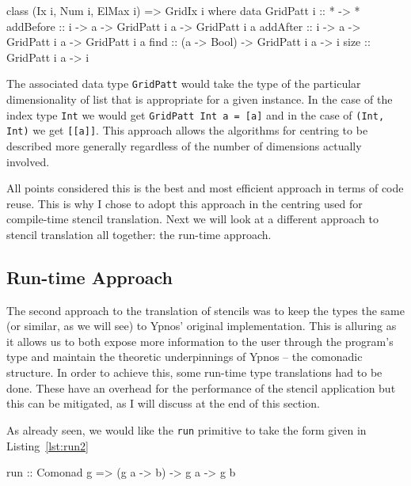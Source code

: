 \documentclass[12pt,a4paper,twoside]{scrbook}
\begin{document}
\begin{hflisting}[label={lst:gridix}, caption=The class declaration of
  \texttt{GridIx} showing the main functions defined for the grid manipulation.]
class (Ix i, Num i, ElMax i) => GridIx i where
    data GridPatt i :: * -> *
    addBefore :: i -> a -> GridPatt i a -> GridPatt i a
    addAfter :: i -> a -> GridPatt i a -> GridPatt i a
    find :: (a -> Bool) -> GridPatt i a -> i
    size :: GridPatt i a -> i
\end{hflisting}

The associated data type \texttt{GridPatt} would take the type of the particular
dimensionality of list that is appropriate for a given instance. In the case of
the index type \texttt{Int} we would get \texttt{GridPatt Int a = {[}a{]}} and
in the case of \texttt{(Int, Int)} we get \texttt{{[}{[}a{]}{]}}. This approach
allows the algorithms for centring to be described more generally regardless of
the number of dimensions actually involved.

All points considered this is the best and most efficient approach in terms of
code reuse. This is why I chose to adopt this approach in the centring used for
compile-time stencil translation. Next we will look at a different approach to
stencil translation all together: the run-time approach.

\subsection{Run-time Approach}
\label{sec:runtimetrans}

The second approach to the translation of stencils was to keep the types the
same (or similar, as we will see) to Ypnos' original implementation.  This is
alluring as it allows us to both expose more information to the user through the
program's type and maintain the theoretic underpinnings of Ypnos -- the
comonadic structure. In order to achieve this, some run-time type translations
had to be done. These have an overhead for the performance of the stencil
application but this can be mitigated, as I will discuss at the end of this
section.

As already seen, we would like the \texttt{run} primitive to take the
form given in Listing~\ref{lst:run2}

\begin{hflisting}[label={lst:run2}, caption=The comonadic run type. Changing the
  type of \texttt{g} could change the backend used.]
run :: Comonad g => (g a -> b) -> g a -> g b
\end{hflisting}
\end{document}
